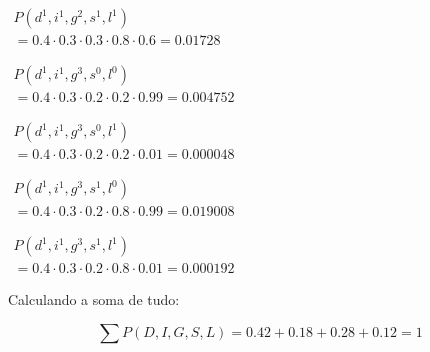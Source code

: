 $\begin{array}{l}
    P(d^1, i^1, g^2, s^1, l^1) \\
    = 0.4 \cdot 0.3 \cdot 0.3 \cdot 0.8 \cdot 0.6 = 0.01728
\end{array}$

$\begin{array}{l}
    P(d^1, i^1, g^3, s^0, l^0) \\
    = 0.4 \cdot 0.3 \cdot 0.2 \cdot 0.2 \cdot 0.99 = 0.004752
\end{array}$

$\begin{array}{l}
    P(d^1, i^1, g^3, s^0, l^1) \\
    = 0.4 \cdot 0.3 \cdot 0.2 \cdot 0.2 \cdot 0.01 = 0.000048
\end{array}$

$\begin{array}{l}
    P(d^1, i^1, g^3, s^1, l^0) \\
    = 0.4 \cdot 0.3 \cdot 0.2 \cdot 0.8 \cdot 0.99 = 0.019008
\end{array}$

$\begin{array}{l}
    P(d^1, i^1, g^3, s^1, l^1) \\
    = 0.4 \cdot 0.3 \cdot 0.2 \cdot 0.8 \cdot 0.01 = 0.000192
\end{array}$

Calculando a soma de tudo:

\[\sum P(D,I,G,S,L) = 0.42 + 0.18 + 0.28 + 0.12 = 1\]
